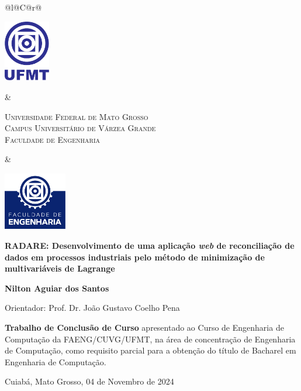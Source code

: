 \begin{titlepage}

\begin{center}

\small

\begin{tabularx}{\linewidth}{@{}l@{}C@{}r@{}}
\parbox[c]{2cm}{\includegraphics[width=2cm]{pre-textuais/figuras/ufmt}} &
\begin{center}
\textsf{\textsc{Universidade Federal de Mato Grosso\\
Campus Universitário de Várzea Grande\\
Faculdade de Engenharia}}
\end{center} &
\parbox[c]{2cm}{\includegraphics[width=2.75cm]{pre-textuais/figuras/faeng}}
\end{tabularx}

\vfill

\LARGE

\textbf{RADARE: Desenvolvimento de uma aplicação \textit{web} de reconciliação de dados em processos industriais pelo método de minimização de multivariáveis de Lagrange}

\vfill

\Large

\textbf{Nilton Aguiar dos Santos}

\vfill

\normalsize

Orientador: Prof. Dr. João Gustavo Coelho Pena

\vfill

\hfill
\parbox{0.5\linewidth}{\textbf{Trabalho de Conclusão de Curso}
apresentado ao Curso de Engenharia de Computação da FAENG/CUVG/UFMT,
na área de concentração de Engenharia de Computação,
como requisito parcial para a obtenção do título de Bacharel
em Engenharia de Computação.}

\vfill

\large

Cuiabá, Mato Grosso, 04 de Novembro de 2024

\end{center}

\end{titlepage}
